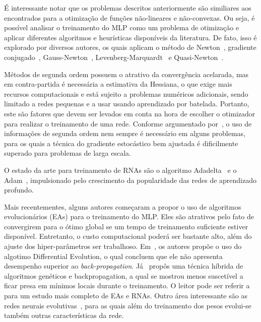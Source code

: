 \documentclass[conference]{IEEEtran}
\begin{document}
	É interessante notar que os problemas descritos anteriormente são similiares aos encontrados para a otimização de funções não-lineares e não-convexas. Ou seja, é possível analisar o treinamento do MLP como um problema de otimização e aplicar diferentes algoritmos e heurísticas disponíveis da literatura. De fato, isso é explorado por diversos autores, os quais aplicam o método de Newton~\cite{becker1988improving}, gradiente conjugado~\cite{johansson1991backpropagation}, Gauss-Newton~\cite{battiti1992first}, Levenberg-Marquardt~\cite{hagan1994training} e Quasi-Newton~\cite{robitaille1996modified}.  
	
	Métodos de segunda ordem possuem o atrativo da convergência acelarada, mas em contra-partida é necessária a estimativa da Hessiana, o que exige mais recursos computacionais e está sujeito a problemas numéricos adicionais, sendo limitado a redes pequenas e a usar usando aprendizado por batelada. Portanto, este são fatores que devem ser levados em conta na hora de escolher o otimizador para realizar o treinamento de uma rede. Conforme argumentado por~\cite{lecun2012efficient}, o uso de informações de segunda ordem nem sempre é necessário em alguns problemas, para os quais a técnica do gradiente estocástico bem ajustada é dificilmente superado para problemas de larga escala.
	
	O estado da arte para treinamento de RNAs são o algoritmo Adadelta~\cite{zeiler2012adadelta} e o Adam~\cite{kingma2014adam}, impulsionado pelo crescimento da popularidade das redes de aprendizado profundo. 
	
	
	Mais recentementes, alguns autores começaram a propor o uso de algoritmos evolucionários (EAs) para o treinamento do MLP. Eles são atrativos pelo fato de convergirem para o ótimo global se um tempo de treinamento suficiente estiver disponível. Entretanto, o custo computacional poderá ser bastante alto, além do ajuste dos hiper-parâmetros ser trabalhoso. Em~\cite{ilonen2003differential}, os autores propõe o uso do algotimo Differential Evolution, o qual concluem que ele não apresenta desempenho superior ao \textit{back-propagation}. Já~\cite{ding2011optimizing} propôs uma técnica híbrida de algoritmos genéticos e backpropagation, a qual se mostrou menos suscetível a ficar presa em mínimos locais durante o treinamento. O leitor pode ser referir a~\cite{mirjalili2019evolutionary} para um estudo mais completo de EAs e RNAs. Outro área interessante são as redes neurais evolutivas~\cite{yao1999evolving}, para as quais além do treinamento dos pesos evolui-se também outras características da rede.
	
\end{document}
